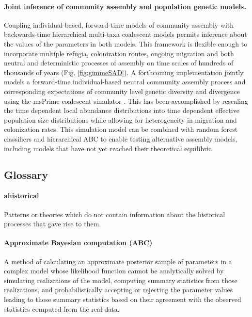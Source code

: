 \documentclass[12pt]{article}
\begin{document}
\paragraph{Joint inference of community assembly and population
  genetic models.} Coupling individual-based, forward-time models of
community assembly with backwards-time hierarchical multi-taxa
coalescent models permits inference about the values of the parameters
in both models. This framework is flexible enough to incorporate
multiple refugia, colonization routes, ongoing migration and both
neutral and deterministic processes of assembly on time scales of
hundreds of thousands of years (Fig. \ref{fig:gimmeSAD}). A
forthcoming implementation \citep[gimmeSAD$\pi$;][]{overcast}
jointly models a forward-time individual-based neutral community assembly process
\citep{Rosindell2015-dk} and corresponding expectations of community level genetic 
diversity and divergence using the msPrime coalescent simulator
\citep{kelleher2016}. This has been accomplished by rescaling the time
dependent local abundance distributions into time dependent effective
population size distributions while allowing for heterogeneity in
migration and colonization rates. This simulation model can be
combined with random forest classifiers and hierarchical ABC to enable
testing alternative assembly models, including models that have not
yet reached their theoretical equilibria.


\subsection*{Glossary}

\paragraph{ahistorical} Patterns or theories which do not contain
information about the historical processes that gave rise to them.

\paragraph{Approximate Bayesian computation (ABC)} A method of
calculating an approximate posterior sample of parameters in a complex model
whose likelihood function cannot be analytically solved by simulating
realizations of the model, computing summary statistics from those
realizations, and probabilistically accepting or rejecting the
parameter values leading to those summary statistics based on their
agreement with the observed statistics computed from the real data.
\end{document}
